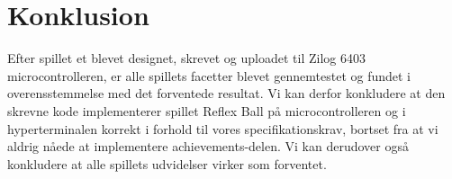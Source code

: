 \newpage
\chapter{Konklusion}
Efter spillet et blevet designet, skrevet og uploadet til Zilog 6403 microcontrolleren, er alle spillets facetter blevet gennemtestet og fundet i overensstemmelse med det forventede resultat. Vi kan derfor konkludere at den skrevne kode implementerer spillet Reflex Ball på microcontrolleren og i hyperterminalen korrekt i forhold til vores specifikationskrav, bortset fra at vi aldrig nåede at implementere achievements-delen. Vi kan derudover også konkludere at alle spillets udvidelser virker som forventet. \\

